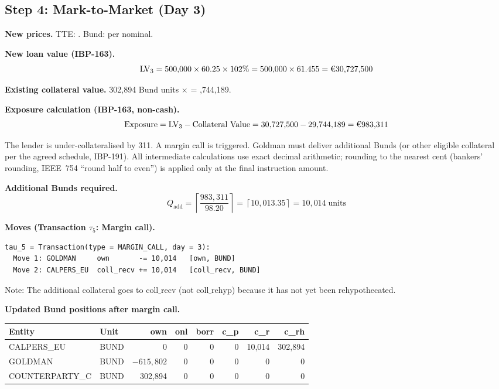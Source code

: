 \documentclass[11pt,a4paper]{article}
\newcommand{\EUR}[1]{\texteuro#1}
\begin{document}
\subsection{Step 4: Mark-to-Market (Day 3)}
\label{sec:eu-step4}

\noindent\textbf{New prices.} TTE: \EUR{60.25}. Bund: \EUR{98.20} per \EUR{100} nominal.

\medskip
\noindent\textbf{New loan value (IBP-163).}
\[
\mathrm{LV}_3 = 500{,}000 \times 60.25 \times 102\% = 500{,}000 \times 61.455 = \text{\EUR{30,727,500}}
\]

\noindent\textbf{Existing collateral value.} 302{,}894 Bund units $\times$ \EUR{98.20} = \EUR{29,744,189}.

\medskip
\noindent\textbf{Exposure calculation (IBP-163, non-cash).}
\[
\text{Exposure} = \mathrm{LV}_3 - \text{Collateral Value} = 30{,}727{,}500 - 29{,}744{,}189 = \text{\EUR{983,311}}
\]

\noindent The lender is under-collateralised by \EUR{983{,}311}. A margin call is triggered. Goldman must deliver additional Bunds (or other eligible collateral per the agreed schedule, IBP-191). All intermediate calculations use exact decimal arithmetic; rounding to the nearest cent (bankers' rounding, IEEE~754 ``round half to even'') is applied only at the final instruction amount.

\medskip
\noindent\textbf{Additional Bunds required.}
\[
Q_{\mathrm{add}} = \left\lceil \frac{983{,}311}{98.20} \right\rceil = \left\lceil 10{,}013.35 \right\rceil = 10{,}014 \;\text{units}
\]

\noindent\textbf{Moves (Transaction $\tau_5$: Margin call).}

\begin{lstlisting}
tau_5 = Transaction(type = MARGIN_CALL, day = 3):
  Move 1: GOLDMAN     own       -= 10,014   [own, BUND]
  Move 2: CALPERS_EU  coll_recv += 10,014   [coll_recv, BUND]
\end{lstlisting}

\noindent Note: The additional collateral goes to $\mathrm{coll\_recv}$ (not $\mathrm{coll\_rehyp}$) because it has not yet been rehypothecated.

\medskip
\noindent\textbf{Updated Bund positions after margin call.}

\begin{center}\small
\begin{tabular}{l l r r r r r r}
\toprule
\textbf{Entity} & \textbf{Unit} & own & onl & borr & c\_p & c\_r & c\_rh \\
\midrule
CALPERS\_EU & BUND & 0 & 0 & 0 & 0 & 10{,}014 & 302{,}894 \\
GOLDMAN & BUND & $-615{,}802$ & 0 & 0 & 0 & 0 & 0 \\
COUNTERPARTY\_C & BUND & 302{,}894 & 0 & 0 & 0 & 0 & 0 \\
\bottomrule
\end{tabular}
\end{center}
\end{document}
